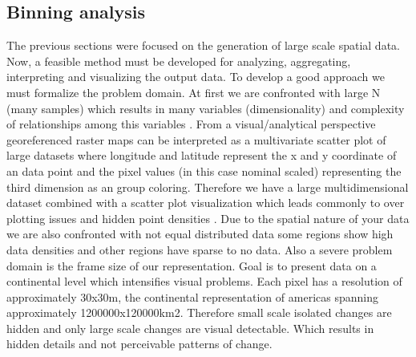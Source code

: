 	\subsection{Binning analysis}
		The previous sections were focused on the generation of large scale spatial data. Now, a feasible method must be developed for analyzing, aggregating, interpreting and visualizing the output data. To develop a good approach we must formalize the problem domain. At first we are confronted with large N (many samples) which results in many variables (dimensionality) and complexity of relationships among this variables \citep{Carr1990}. From a visual/analytical perspective georeferenced raster maps can be interpreted as a multivariate scatter plot of large datasets where longitude and latitude represent the x and y coordinate of an data point and the pixel values (in this case nominal scaled) representing the third dimension as an group coloring. Therefore we have a large multidimensional dataset combined with a scatter plot visualization which leads commonly to over plotting issues and hidden point densities \citep{Carr1987}. Due to the spatial nature of your data we are also confronted with not equal distributed data some regions show high data densities and other regions have sparse to no data. Also a severe problem domain is the frame size of our representation. Goal is to present data on a continental level which intensifies visual problems. Each pixel has a resolution of approximately 30x30m, the continental representation of americas spanning approximately 1200000x120000km2. Therefore small scale isolated changes are hidden and only large scale changes are visual detectable. Which results in hidden details and not perceivable patterns of change.

